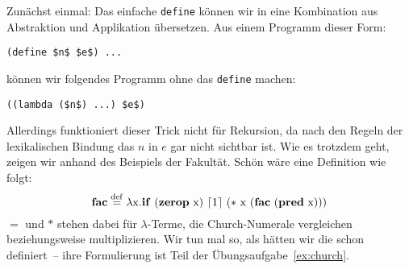 Zunächst einmal: Das einfache \lstinline{define} können wir in eine
Kombination aus Abstraktion und Applikation übersetzen.  Aus einem
Programm dieser Form:
%
\begin{lstlisting}
(define $n$ $e$) ...
\end{lstlisting}
%
können wir folgendes Programm ohne das \lstinline{define} machen:
%
\begin{lstlisting}
((lambda ($n$) ...) $e$)
\end{lstlisting}
%
Allerdings funktioniert dieser Trick nicht für Rekursion, da nach den
Regeln der lexikalischen Bindung das $n$ in $e$ gar nicht sichtbar
ist.  Wie es trotzdem geht, zeigen wir anhand des Beispiels der Fakultät.
Schön wäre eine Definition wie folgt:
%
\begin{displaymath}
  \mathbf{fac} \stackrel{\rm def}{=}{} \lambda \mathrm x.\mathbf{if}~(\mathbf{zerop}~\mathrm
  x)~\lceil 1\rceil ~(\ast~\mathrm x~(\mathbf{fac}~(\mathbf{pred}~\mathrm x)))
\end{displaymath}
%
$=$ und $\ast$ stehen dabei für $\lambda$-Terme, die Church-Numerale
vergleichen beziehungsweise multiplizieren.  Wir tun mal so, als
hätten wir die schon definiert~-- ihre Formulierung ist Teil der
Übungsaufgabe~\ref{ex:church}.

